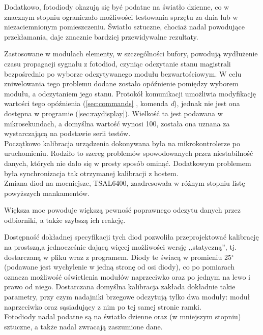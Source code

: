 Dodatkowo, fotodiody okazują się być podatne na światło dzienne, co w znacznym stopniu ograniczało możliwości testowania sprzętu za dnia lub w niezaciemnionym pomieszczeniu. Światło sztuczne, chociaż nadal powodujące przekłamania, daje znacznie bardziej przewidywalne rezultaty.

Zastosowane w modułach elementy, w szczególności bufory, powodują wydłużenie czasu propagacji sygnału z fotodiod, czyniąc odczytanie stanu magistrali bezpośrednio po wyborze odczytywanego modułu bezwartościowym.
W celu zniwelowania tego problemu dodane zostało opóźnienie pomiędzy wyborem modułu, a odczytaniem jego stanu.
Protokół komunikacji umożliwia modyfikację wartości tego opóźnienia (\ref{sec:commands} , komenda \textsl{d}), jednak nie jest ona dostępna w programie  (\ref{sec:raydisplay}).
Wielkość ta jest podawana w mikrosekundach, a domyślna wartość wynosi 100, została ona uznana za wystarczającą na podstawie serii testów.\\



Początkowo kalibracja urządzenia dokonywana była na mikrokontrolerze po uruchomieniu.
Rodziło to szereg problemów spowodowanych przez niestabilność danych, których nie dało się w prosty sposób ominąć.
Dodatkowym problemem była synchronizacja tak otrzymanej kalibracji z hostem.\\


Zmiana diod na mocniejsze, TSAL6400, zaadresowała w różnym stopniu listę powyższych mankamentów.

Większa moc powoduje większą pewność poprawnego odczytu danych przez odbiorniki, a także szybszą ich reakcję.

Dostępność dokładnej specyfikacji tych diod pozwoliła przeprojektować kalibrację na prostszą,a jednocześnie dającą więcej możliwości wersję ,,statyczną'', tj. dostarczaną w pliku wraz z programem.
Diody te świacą w promieniu 25$^{\circ}$ (podawane jest wychylenie w jedną stronę od osi diody), co po pomiarach oznacza możliwość oświetlenia modułów naprzeciwko oraz po jednym na lewo i prawo od niego.
Dostarczana domyślna kalibracja zakłada dokładnie takie parametry, przy czym nadajniki brzegowe odczytują tylko dwa moduły: moduł naprzeciwko oraz sąsiadujący z nim po tej samej stronie ramki.\\

Fotodiody nadal podatne są na światło dzienne oraz (w mniejszym stopniu) sztuczne, a także nadal zwracają zaszumione dane.

